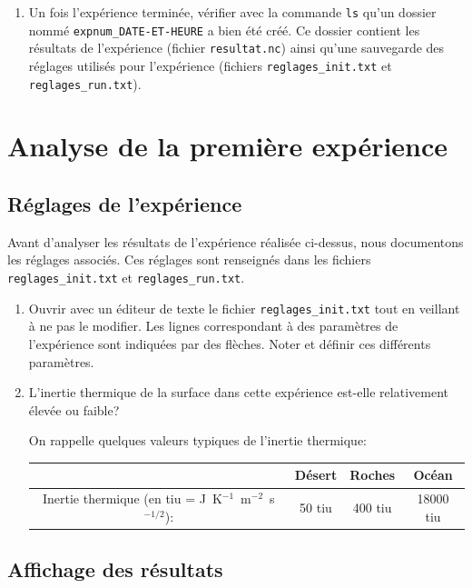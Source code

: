 \documentclass[a4paper,12pt]{article}
\begin{document}
\begin{enumerate}
\item Un fois l'expérience terminée, vérifier avec la commande \texttt{ls}
qu'un dossier nommé \texttt{expnum\-\_DATE\--ET\--HEURE} a bien été créé. Ce
dossier contient les résultats de l'expérience (fichier \texttt{resultat.nc})
ainsi qu'une sauvegarde des réglages utilisés pour l'expérience (fichiers
\texttt{regla\-ges\_\-init.txt} et \texttt{reglages\_\-run.txt}).
\end{enumerate}




\section{Analyse de la première expérience}
\label{sct-analyse}

\subsection{Réglages de l'expérience}

Avant d'analyser les résultats de l'expérience réalisée ci-dessus, nous
documentons les réglages associés. Ces réglages sont renseignés dans les
fichiers \texttt{reglages\_init.txt} et \texttt{reglages\_run.txt}.

\begin{enumerate}
\item Ouvrir avec un éditeur de texte le fichier \texttt{reglages\_init.txt}
tout en veillant à ne pas le modifier. Les lignes correspondant à des
paramètres de l'expérience sont indiquées par des flèches. Noter et définir ces
différents paramètres.
\item L'inertie thermique de la surface dans cette expérience est-elle
relativement élevée ou faible?

On rappelle quelques valeurs typiques de l'inertie thermique:

\begin{table}[h!]
\centering
\begin{tabular}{c|c|c|c}
& Désert & Roches & Océan \\ \hline
Inertie thermique (en tiu = J~K$^{-1}$~m$^{-2}$~s$^{-1/2}$): & 50 tiu &
400 tiu & 18000 tiu \\
\end{tabular}
\end{table}
\end{enumerate}

\subsection{Affichage des résultats}
\label{sct-display}
\end{document}
